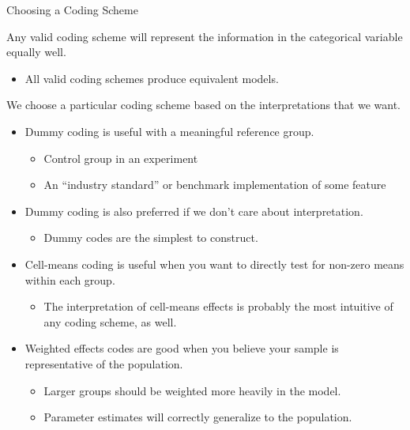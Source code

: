 \documentclass{beamer}\usepackage[]{graphicx}\usepackage[]{color}
\begin{document}
\begin{frame}[allowframebreaks]{Choosing a Coding Scheme}
  
  Any valid coding scheme will represent the information in the categorical 
  variable equally well.
  \vc
  \begin{itemize}
  \item All valid coding schemes produce equivalent models. 
  \end{itemize}
  \vb
  We choose a particular coding scheme based on the interpretations that we 
  want.
  \vc
  \begin{itemize}
  \item Dummy coding is useful with a meaningful reference group.
    \begin{itemize}
    \item Control group in an experiment
    \item An ``industry standard'' or benchmark implementation of some feature
    \end{itemize}
    \vc
  \item Dummy coding is also preferred if we don't care about interpretation.
    \begin{itemize}
    \item Dummy codes are the simplest to construct.
    \end{itemize}
    
    \pagebreak
    
  \item Cell-means coding is useful when you want to directly test for non-zero 
    means within each group.
    \begin{itemize}
    \item The interpretation of cell-means effects is probably the most 
      intuitive of any coding scheme, as well.
    \end{itemize}
    \vc
  \item Weighted effects codes are good when you believe your sample is 
    representative of the population.
    \begin{itemize}
    \item Larger groups should be weighted more heavily in the model.
      \vc
    \item Parameter estimates will correctly generalize to the population.
    \end{itemize}
    
    \pagebreak
    

\end{itemize}
\end{frame}
\end{document}
